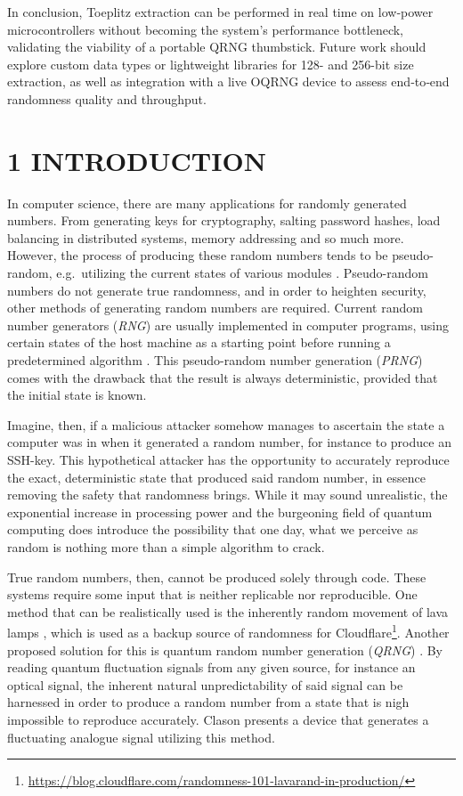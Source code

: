 \documentclass{sigchi}
\begin{document}
In conclusion, Toeplitz extraction can be performed in real time on low‐power microcontrollers without becoming the system's performance bottleneck, validating the viability of a portable QRNG thumbstick. Future work should explore custom data types or lightweight libraries for 128- and 256-bit size extraction, as well as integration with a live OQRNG device to assess end‐to‐end randomness quality and throughput.

\section{1 INTRODUCTION}\label{introduction}

In computer science, there are many applications for randomly generated numbers. From generating keys for cryptography, salting password hashes, load balancing in distributed systems, memory addressing and so much more. However, the process of producing these random numbers tends to be pseudo-random, e.g.~utilizing the current states of various modules \cite{randomness}. Pseudo-random numbers do not generate true randomness, and in order to heighten security, other methods of generating random numbers are required. Current random number generators (\emph{RNG}) are usually implemented in computer programs, using certain states of the host machine as a starting point before running a predetermined algorithm \cite{randomness}. This pseudo-random number generation (\emph{PRNG}) comes with the drawback that the result is always deterministic, provided that the initial state is known.

Imagine, then, if a malicious attacker somehow manages to ascertain the state a computer was in when it generated a random number, for instance to produce an SSH-key. This hypothetical attacker has the opportunity to accurately reproduce the exact, deterministic state that produced said random number, in essence removing the safety that randomness brings. While it may sound unrealistic, the exponential increase in processing power and the burgeoning field of quantum computing does introduce the possibility that one day, what we perceive as random is nothing more than a simple algorithm to crack.

True random numbers, then, cannot be produced solely through code. These systems require some input that is neither replicable nor reproducible. One method that can be realistically used is the inherently random movement of lava lamps \cite{lavarand}, which is used as a backup source of randomness for Cloudflare\footnote{\url{https://blog.cloudflare.com/randomness-101-lavarand-in-production/}}. Another proposed solution for this is quantum random number generation (\emph{QRNG}) \cite{QRNG}. By reading quantum fluctuation signals from any given source, for instance an optical signal, the inherent natural unpredictability of said signal can be harnessed in order to produce a random number from a state that is nigh impossible to reproduce accurately. Clason \cite{Clason2023} presents a device that generates a fluctuating analogue signal utilizing this method.
\end{document}
